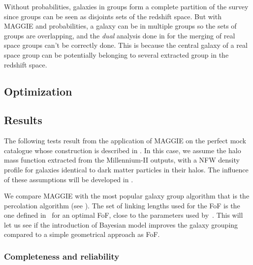 Without probabilities, galaxies in groups form a complete partition of the
survey since groups can be seen as disjoints sets of the redshift space. But
with MAGGIE and probabilities, a galaxy can be in multiple groups so the
sets of groups are overlapping, and the \emph{dual} analysis done in
\citet{DM+14a} for the merging of real space groups can't be correctly done.
This is because the central galaxy of a real space group can be potentially
belonging to several extracted group in the redshift space.

\subsection{Optimization}

\subsection{Results}

The following tests result from the application of MAGGIE on the perfect mock
catalogue whose construction is described in . In this
case, we assume the halo mass function extracted from the Millennium-II
outputs, with a NFW density profile for galaxies identical to dark matter
particles in their halos. The influence of these assumptions will be developed
in .

We compare MAGGIE with the most popular galaxy group algorithm that is the
percolation algorithm (see ). The
set of linking lengths used for the FoF is the one defined in~\cite{Duarte+14}
for an optimal FoF, close to the parameters used by~\cite{Robotham+11}. This
will let us see if the introduction of Bayesian model improves the galaxy
grouping compared to a simple geometrical approach as FoF.

\subsubsection{Completeness and reliability}

